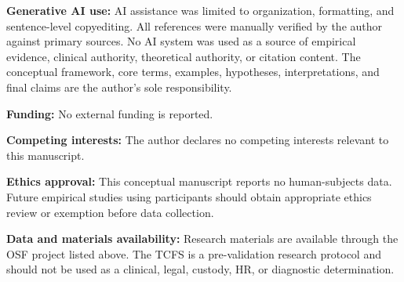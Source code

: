 \documentclass[11pt, letterpaper]{article}
\newcommand{\term}[1]{\textbf{#1}}
\begin{document}
\term{Generative AI use:} AI assistance was limited to organization, formatting, and sentence-level copyediting. All references were manually verified by the author against primary sources. No AI system was used as a source of empirical evidence, clinical authority, theoretical authority, or citation content. The conceptual framework, core terms, examples, hypotheses, interpretations, and final claims are the author's sole responsibility.

\term{Funding:} No external funding is reported.

\term{Competing interests:} The author declares no competing interests relevant to this manuscript.

\term{Ethics approval:} This conceptual manuscript reports no human-subjects data. Future empirical studies using participants should obtain appropriate ethics review or exemption before data collection.

\term{Data and materials availability:} Research materials are available through the OSF project listed above. The TCFS is a pre-validation research protocol and should not be used as a clinical, legal, custody, HR, or diagnostic determination.
\end{document}
